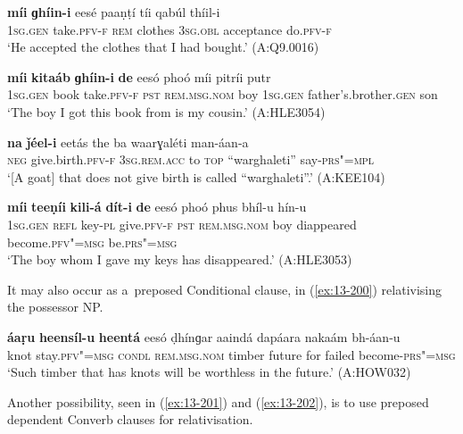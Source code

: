 \begin{exe}
\ex
\label{ex:13-196}
\gll \textbf{míi} \textbf{ɡhíin-i} eesé paaṇṭí tíi qabúl  thíil-i \\
\textsc{1sg.gen} take.\textsc{pfv-f} \textsc{rem} clothes \textsc{3sg.obl} acceptance do.\textsc{pfv-f} \\
\glt `He accepted the clothes that I had bought.' (A:Q9.0016)

\ex
\label{ex:13-197}
\gll \textbf{míi} \textbf{kitaáb} \textbf{ɡhíin-i} \textbf{de} eesó phoó  míi pitríi putr \\
\textsc{1sg.gen} book take.\textsc{pfv-f} \textsc{pst} \textsc{rem.msg.nom} boy  \textsc{1sg.gen} father's.brother.\textsc{gen} son \\
\glt `The boy I got this book from is my cousin.' (A:HLE3054)

\ex
\label{ex:13-198}
\gll \textbf{na} \textbf{ǰéel-i} eetás the ba  waarɣaléti man-áan-a \\
\textsc{neg} give.birth.\textsc{pfv-f} \textsc{3sg.rem.acc} to \textsc{top} ``warghaleti'' say-\textsc{prs"=mpl} \\
\glt `[A goat] that does not give birth is called ``warghaleti''.' (A:KEE104)

\ex
\label{ex:13-199}
\gll \textbf{míi} \textbf{teeṇíi} \textbf{kili-á} \textbf{dít-i} \textbf{de} eesó  phoó phus bhíl-u hín-u  \\
\textsc{1sg.gen} \textsc{refl} key-\textsc{pl} give.\textsc{pfv-f} \textsc{pst} \textsc{rem.msg.nom}  boy diappeared become.\textsc{pfv"=msg} be.\textsc{prs"=msg} \\
\glt `The boy whom I gave my keys has disappeared.' (A:HLE3053) 
\end{exe}

It may also occur as a~preposed Conditional clause, in (\ref{ex:13-200}) relativising the possessor NP.

\begin{exe}
\ex
\label{ex:13-200}
\gll \textbf{áaṛu} \textbf{heensíl-u} \textbf{heentá} eesó ḍhínɡar aaindá  dapáara nakaám bh-áan-u  \\
knot stay.\textsc{pfv"=msg} \textsc{condl} \textsc{rem.msg.nom} timber future  for failed become-\textsc{prs"=msg} \\
\glt `Such timber that has knots will be worthless in the future.' (A:HOW032) 
\end{exe}

Another possibility, seen in (\ref{ex:13-201}) and (\ref{ex:13-202}), is to use preposed dependent Converb clauses for relativisation.

